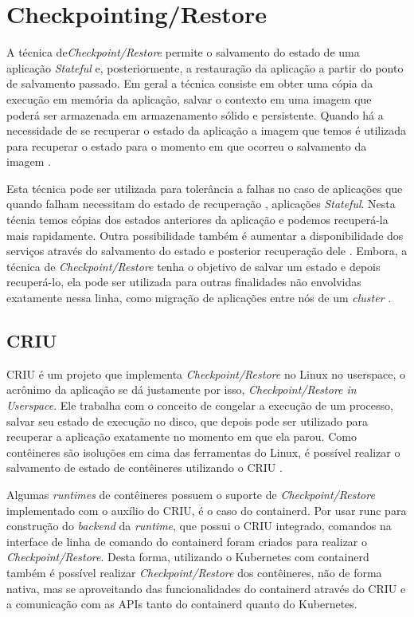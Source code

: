 \section{Checkpointing/Restore}

A técnica de\textit{Checkpoint/Restore} permite o salvamento do estado de
uma aplicação \textit{Stateful} e, posteriormente, a restauração da
aplicação a partir do ponto de salvamento passado. Em geral a técnica
consiste em obter uma cópia da execução em memória da aplicação, salvar o
contexto em uma imagem que poderá ser armazenada em armazenamento sólido e
persistente. Quando há a necessidade de se recuperar o estado da aplicação
a imagem que temos é utilizada para recuperar o estado para o momento em
que ocorreu o salvamento da imagem \cite{laadan2010linux}.

Esta técnica pode ser utilizada para tolerância a falhas no caso de aplicações
que quando falham necessitam do estado de recuperação \cite{muller2022architecture}
\cite{Chen2015/10}, aplicações \textit{Stateful}. Nesta técnia temos cópias
dos estados anteriores da aplicação e podemos recuperá-la mais rapidamente.
Outra possibilidade também é aumentar a disponibilidade dos serviços através
do salvamento do estado e posterior recuperação dele \cite{vayghan2021kubernetes}.
Embora, a técnica de \textit{Checkpoint/Restore} tenha o objetivo de salvar um
estado e depois recuperá-lo, ela pode ser utilizada para outras finalidades não
envolvidas exatamente nessa linha, como migração de aplicações entre nós de um
\textit{cluster} \cite{Chen2015/10}.

\subsection{CRIU}

CRIU é um projeto que implementa \textit{Checkpoint/Restore} no Linux no
userspace, o acrônimo da aplicação se dá justamente por isso,
\textit{Checkpoint/Restore in Userspace}. Ele trabalha com o conceito de
congelar a execução de um processo, salvar seu estado de execução no disco,
que depois pode ser utilizado para recuperar a aplicação exatamente no
momento em que ela parou. Como contêineres são isoluções em cima das
ferramentas do Linux, é possível realizar o salvamento de estado de
contêineres utilizando o CRIU \cite{criu}.

Algumas \textit{runtimes} de contêineres possuem o suporte de
\textit{Checkpoint/Restore} implementado com o auxílio do CRIU, é o caso
do containerd. Por usar runc para construção do \textit{backend} da
\textit{runtime}, que possui o CRIU integrado, comandos na
interface de linha de comando do containerd foram criados para realizar o
\textit{Checkpoint/Restore}. Desta forma, utilizando o Kubernetes com
containerd também é possível realizar \textit{Checkpoint/Restore} dos
contêineres, não de forma nativa, mas se aproveitando das funcionalidades
do containerd através do CRIU e a comunicação com as APIs tanto do containerd
quanto do Kubernetes.

